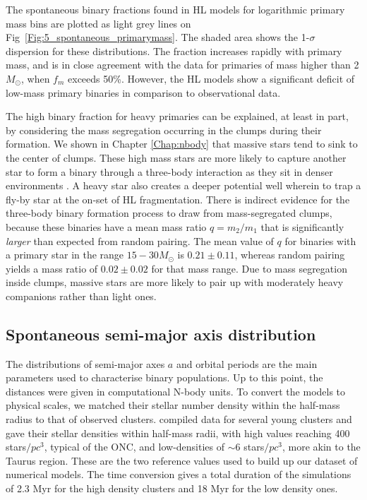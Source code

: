 The spontaneous binary fractions found in HL models for logarithmic primary mass bins are plotted as light grey lines on Fig~\ref{Fig:5_spontaneous_primarymass}. The shaded area shows the 1-$\sigma$ dispersion for these distributions. The fraction increases rapidly  with primary mass,  and is in close agreement with the data for primaries of mass higher than 2 $M_\odot$, when $f_m$ exceeds 50\%.  However, the HL  models show  a significant deficit of low-mass primary binaries in comparison to observational data.  

The high binary fraction for heavy primaries can be explained, at least in part,  by considering the mass segregation occurring in the clumps during their formation. We shown in Chapter \ref{Chap:nbody} that massive stars tend to sink to the center of clumps. These high mass stars are more likely to capture another star to form a binary through a three-body interaction as they sit in denser environments \citep{Spitzer1987}. A heavy star also creates a deeper potential well wherein to trap a fly-by star at the on-set of HL fragmentation. There is indirect evidence for the three-body binary formation process to draw from mass-segregated clumps, because these binaries have a mean mass ratio $q = m_2/m_1$  that is significantly \textit{larger} than expected from random pairing. The mean value of $q$ for  binaries with a primary star in the range $15-30 M_\odot$  is $0.21 \pm 0.11$, whereas random pairing  yields a mass ratio of $0.02 \pm 0.02$ for that mass range. Due to mass segregation inside clumps, massive stars are more likely to pair up with moderately heavy companions rather than light ones.



\subsection{Spontaneous semi-major axis distribution}
\label{Sub:spontaneous_separations}

The distributions of semi-major axes $a$ and orbital  periods are the main parameters used to 
characterise binary populations. Up to this point, the distances were given in  computational N-body units. To convert the models to physical scales, we matched their stellar number density within the half-mass radius to that of observed clusters.  \cite{King2012a}  compiled  data for several young clusters and gave their stellar densities within half-mass radii, with high values reaching  400 stars$/pc^3$, typical of the ONC, and low-densities  of $\sim 6$ stars$/pc^3$, more akin to the Taurus region. These are the two reference values used to build up our dataset of numerical models. The time conversion gives a total duration of the simulations of 2.3 Myr for the high density clusters and 18 Myr for the low density ones.



